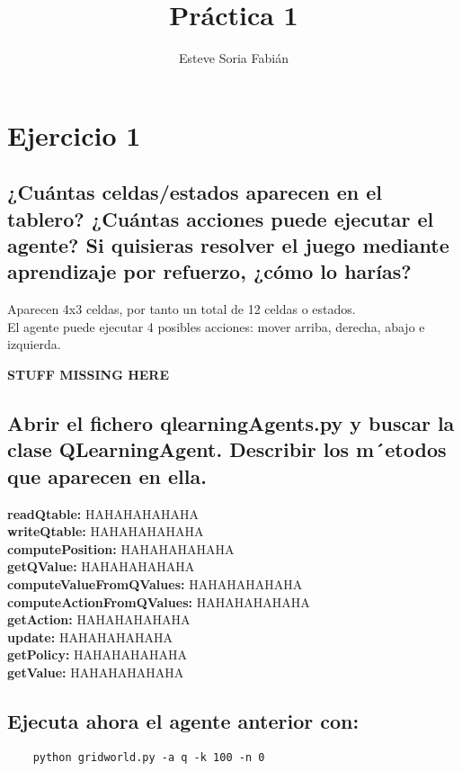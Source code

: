 \documentclass[12pt]{article}
\title{Práctica 1}
\author{Esteve Soria Fabián}
\begin{document}
    \maketitle

    \section*{Ejercicio 1}
    \subsection{¿Cuántas celdas/estados aparecen en el tablero?
    ¿Cuántas acciones puede ejecutar el agente?
    Si quisieras resolver el juego mediante aprendizaje por refuerzo, ¿cómo lo harías?}

    Aparecen 4x3 celdas, por tanto un total de 12 celdas o estados. \\
    El agente puede ejecutar 4 posibles acciones: mover arriba, derecha, abajo e izquierda.

    \textbf{STUFF MISSING HERE}
    
    \subsection{Abrir el fichero qlearningAgents.py y buscar la clase QLearningAgent. Describir los m´etodos que
    aparecen en ella.}
    
    \textbf{readQtable:} HAHAHAHAHAHA \\
    \textbf{writeQtable:} HAHAHAHAHAHA \\
    \textbf{computePosition:} HAHAHAHAHAHA \\
    \textbf{getQValue:} HAHAHAHAHAHA \\
    \textbf{computeValueFromQValues:} HAHAHAHAHAHA \\
    \textbf{computeActionFromQValues:} HAHAHAHAHAHA \\
    \textbf{getAction:} HAHAHAHAHAHA \\
    \textbf{update:} HAHAHAHAHAHA \\
    \textbf{getPolicy:} HAHAHAHAHAHA \\
    \textbf{getValue:} HAHAHAHAHAHA \\

    \subsection{Ejecuta ahora el agente anterior con:}
    \begin{verbatim}
    python gridworld.py -a q -k 100 -n 0
    \end{verbatim}
\end{document}
